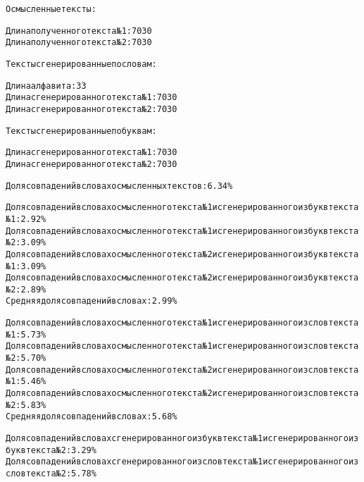 \begin{alltt}

Осмысленные тексты: 

Длина полученного текста №1: 7030
Длина полученного текста №2: 7030

Тексты сгенерированные по словам: 

Длина алфавита: 33
Длина сгенерированного текста №1: 7030
Длина сгенерированного текста №2: 7030

Тексты сгенерированные по буквам: 

Длина сгенерированного текста №1: 7030
Длина сгенерированного текста №2: 7030

Доля совпадений в словах осмысленных текстов: 6.34\% 

Доля совпадений в словах осмысленного текста №1 и сгенерированного из букв текста №1: 2.92\%
Доля совпадений в словах осмысленного текста №1 и сгенерированного из букв текста №2: 3.09\%
Доля совпадений в словах осмысленного текста №2 и сгенерированного из букв текста №1: 3.09\%
Доля совпадений в словах осмысленного текста №2 и сгенерированного из букв текста №2: 2.89\%
Средняя доля совпадений в словах: 2.99\% 

Доля совпадений в словах осмысленного текста №1  и сгенерированного из слов текста №1: 5.73\%
Доля совпадений в словах осмысленного текста №1  и сгенерированного из слов текста №2: 5.70\%
Доля совпадений в словах осмысленного текста №2  и сгенерированного из слов текста №1: 5.46\%
Доля совпадений в словах осмысленного текста №2  и сгенерированного из слов текста №2: 5.83\%
Средняя доля совпадений в словах: 5.68\%

Доля совпадений в словах сгенерированного из букв текста №1 и сгенерированного из букв текста №2: 3.29\%
Доля совпадений в словах сгенерированного из слов текста №1 и сгенерированного из слов текста №2: 5.78\%


\end{alltt}

\pagebreak